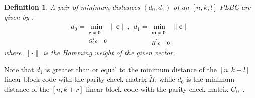 \documentclass[10pt,twocolumn,twoside,submit]{JCNtran}
\newtheorem{definition}[theorem]{Definition}
\newtheorem{remark}[theorem]{Remark}
\begin{document}
	
	
	\begin{definition}
		A pair of minimum distances $\left(d_0, d_1 \right)$ of an $[n, k, l]$ PLBC are given by \cite{Heegard1983plbc}. 
		\begin{align} \label{eq:PLBC_d0}
		d_0 = \underset{
			\substack{
				{\mathbf{c}} \ne {\mathbf{0}} \\
				G_0^T {\mathbf{c}}= {\mathbf{0}}
			}}
			{\text{min }} \|{\mathbf{c}}\|, \:\:
			d_1 = \underset{
				\substack{
					\mathbf{m}  \ne \mathbf{0} \\
					\widetilde{H}^T \mathbf{c}= \mathbf{0}}}
			{\text{min }} \|\mathbf{c}\|
			\end{align}
			where $\| \cdot \|$ is the Hamming weight of the given vector. 
	\end{definition}
	Note that $d_1$ is greater than or equal to the minimum distance of the $[n,k+l]$ linear block code with the parity check matrix $\widetilde{H}$, while $d_0$ is the minimum distance of the $[n,k+r]$ linear block code with the parity check matrix $G_0$~\cite{Heegard1983plbc}. %
	
%	
%	
%	
\end{document}

